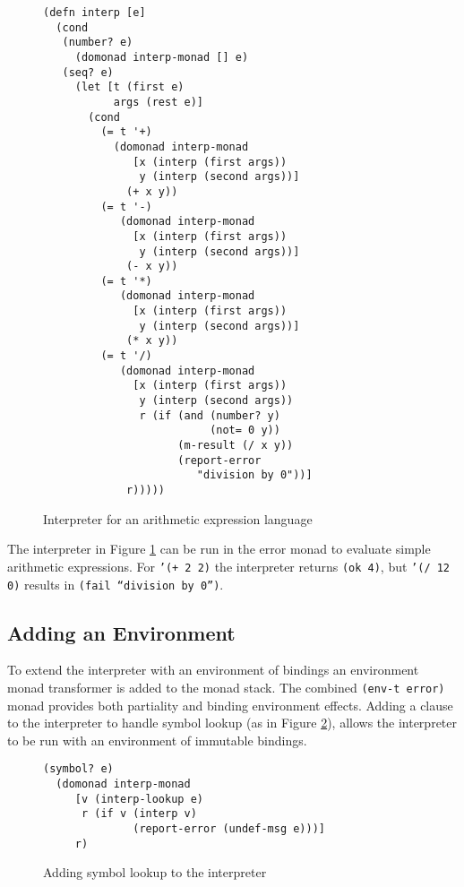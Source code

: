 \documentclass[natbib,10pt]{sigplanconf}
\begin{document}
\begin{figure}
\begin{center}
\begin{verbatim}
(defn interp [e]
  (cond
   (number? e)
     (domonad interp-monad [] e)
   (seq? e)
     (let [t (first e)
           args (rest e)]
       (cond
         (= t '+)
           (domonad interp-monad
              [x (interp (first args))
               y (interp (second args))]
             (+ x y))
         (= t '-)
            (domonad interp-monad
              [x (interp (first args))
               y (interp (second args))]
             (- x y))
         (= t '*)
            (domonad interp-monad
              [x (interp (first args))
               y (interp (second args))]
             (* x y))
         (= t '/)
            (domonad interp-monad
              [x (interp (first args))
               y (interp (second args))
               r (if (and (number? y)
                          (not= 0 y))
                     (m-result (/ x y))
                     (report-error
                        "division by 0"))]
             r)))))
\end{verbatim}
\end{center}
\caption{Interpreter for an arithmetic expression language}
\label{fig-interp-0}
\end{figure}

The interpreter in Figure \ref{fig-interp-0} can be run in the error
monad to evaluate simple arithmetic expressions.  For {\tt '(+ 2 2)}
the interpreter returns {\tt (ok 4)}, but {\tt '(/ 12 0)} results in
{\tt (fail ``division by 0'')}.

\subsection{Adding an Environment}

To extend the interpreter with an environment of bindings an
environment monad transformer is added to the monad stack.  The
combined {\tt (env-t error)} monad provides both partiality and
binding environment effects. Adding a clause to the interpreter
to handle symbol lookup (as in Figure \ref{fig-interp-1}),
allows the interpreter to be run with an environment of immutable
bindings.

\begin{figure}
\begin{center}
\begin{verbatim}
(symbol? e)
  (domonad interp-monad
     [v (interp-lookup e)
      r (if v (interp v)
              (report-error (undef-msg e)))]
     r)
\end{verbatim}
\end{center}
\caption{Adding symbol lookup to the interpreter}
\label{fig-interp-1}
\end{figure}
\end{document}
